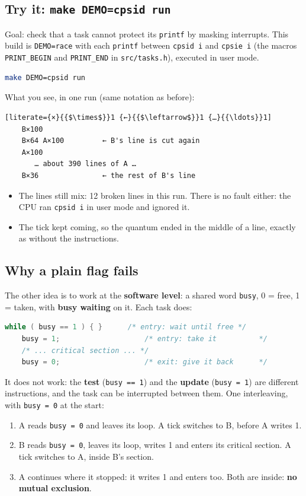 \subsection{Try it: \texttt{make DEMO=cpsid run}}
Goal: check that a task cannot protect its \texttt{printf} by masking interrupts. This build is \texttt{DEMO=race} with each \texttt{printf} between \texttt{cpsid i} and \texttt{cpsie i} (the macros \texttt{PRINT\_BEGIN} and \texttt{PRINT\_END} in \texttt{src/tasks.h}), executed in user mode.
\begin{lstlisting}[language=bash]
    make DEMO=cpsid run
\end{lstlisting}
What you see, in one run (same notation as before):
\begin{lstlisting}[literate={×}{{$\times$}}1 {←}{{$\leftarrow$}}1 {…}{{\ldots}}1]
    B×100
    B×64 A×100         ← B's line is cut again
    A×100
       … about 390 lines of A …
    B×36               ← the rest of B's line
\end{lstlisting}
\begin{itemize}
    \item The lines still mix: 12 broken lines in this run. There is no fault either: the CPU ran \texttt{cpsid i} in user mode and ignored it.
    \item The tick kept coming, so the quantum ended in the middle of a line, exactly as without the instructions.
\end{itemize}

\subsection{Why a plain flag fails}
The other idea is to work at the \textbf{software level}: a shared word \texttt{busy}, 0 = free, 1 = taken, with \textbf{busy waiting} on it. Each task does:
\begin{lstlisting}[language=C, showstringspaces=false]
    while ( busy == 1 ) { }      /* entry: wait until free */
    busy = 1;                    /* entry: take it          */
    /* ... critical section ... */
    busy = 0;                    /* exit: give it back      */
\end{lstlisting}
It does not work: the \textbf{test} (\texttt{busy == 1}) and the \textbf{update} (\texttt{busy = 1}) are different instructions, and the task can be interrupted between them. One interleaving, with \texttt{busy = 0} at the start:
\begin{enumerate}
    \item A reads \texttt{busy = 0} and leaves its loop. A tick switches to B, before A writes 1.
    \item B reads \texttt{busy = 0}, leaves its loop, writes 1 and enters its critical section. A tick switches to A, inside B's section.
    \item A continues where it stopped: it writes 1 and enters too. Both are inside: \textbf{no mutual exclusion}.
\end{enumerate}

